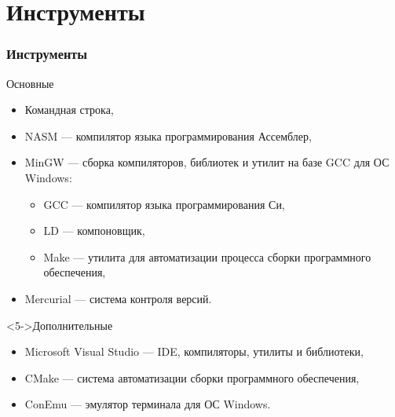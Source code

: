 \documentclass[pdf,9pt,aspectratio=169]{beamer}
\begin{document}
\section{Инструменты}

\begin{frame}\frametitle{Инструменты}
  \begin{block}{Основные}
    \begin{itemize}
      \item<1-> Командная строка,
      \item<2-> NASM --- компилятор языка программирования Ассемблер,
      \item<3-> MinGW --- сборка компиляторов, библиотек и утилит на базе GCC для ОС Windows:
      \begin{itemize}
        \item GCC --- компилятор языка программирования Си,
        \item LD --- компоновщик,
        \item Make --- утилита для автоматизации процесса сборки программного обеспечения,
      \end{itemize}
      \item<4-> Mercurial --- система контроля версий.    
    \end{itemize}      
  \end{block}
  \begin{block}<5->{Дополнительные}
    \begin{itemize}
      \item Microsoft Visual Studio --- IDE, компиляторы, утилиты и библиотеки,
      \item CMake --- система автоматизации сборки программного обеспечения,
      \item ConEmu --- эмулятор терминала для ОС Windows.
    \end{itemize}      
  \end{block}
\end{frame}
\end{document}
